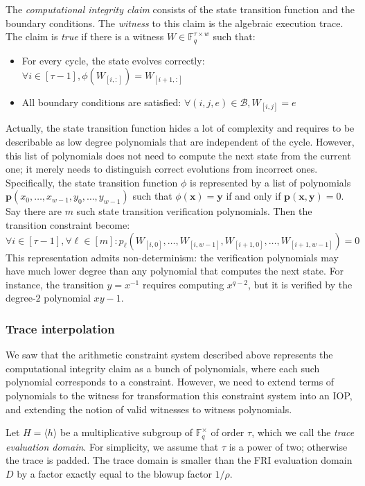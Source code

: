\documentclass[../../book]{subfiles}
\begin{document}
The \emph{computational integrity claim} consists of the state transition function and the boundary conditions. The \emph{witness} to this claim is the algebraic execution trace. The claim is \emph{true} if there is a witness $W\in \mathbb{F}_q^{\tau \times w}$ such that:
\begin{itemize}
  \item For every cycle, the state evolves correctly: $\forall i\in [\tau-1], \phi(W_{[i, :]})=W_{[i+1, :]}$
  \item All boundary conditions are satisfied: $\forall (i, j, e)\in \mathcal{B}, W_{[i, j]}=e$
\end{itemize}
Actually, the state transition function hides a lot of complexity and requires to be describable as low degree polynomials that are independent of the cycle.
However, this list of polynomials does not need to compute the next state from the current one; it merely needs to distinguish correct evolutions from incorrect ones. Specifically, the state transition function $\phi$ is represented by a list of polynomials $\mathbf{p}(x_0,\ldots,x_{w-1}, y_0,\ldots,y_{w-1})$ such that $\phi(\mathbf{x})=\mathbf{y}$ if and only if $\mathbf{p}(\mathbf{x},\mathbf{y})=0$. Say there are $m$ such state transition verification polynomials. Then the transition constraint become:
\begin{equation*}
  \forall i\in[\tau-1],\forall  \ell\in[m]: p_\ell(W_{[i, 0]},\ldots,W_{[i, w-1]},W_{[i+1, 0]},\ldots,W_{[i+1, w-1]})=0
\end{equation*}
This representation admits non-determinism: the verification polynomials may have much lower degree than any polynomial that computes the next state. For instance, the transition $y = x^{-1}$ requires computing $x^{q-2}$, but it is verified by the degree-$2$ polynomial $xy - 1$.

\subsubsection{Trace interpolation}
We saw that the arithmetic constraint system described above represents the computational integrity claim as a bunch of polynomials, where each such polynomial corresponds to a constraint. However, we need to extend terms of polynomials to the witness for transformation this constraint system into an IOP, and extending the notion of valid witnesses to witness polynomials.

Let $H = \langle h \rangle$ be a multiplicative subgroup of $\mathbb{F}_q^{\times}$ of order $\tau$, which we call the \emph{trace evaluation domain}. For simplicity, we assume that $\tau$ is a power of two; otherwise the trace is padded. The trace domain is smaller than the FRI evaluation domain $D$ by a factor exactly equal to the blowup factor $1/\rho$.
\end{document}
